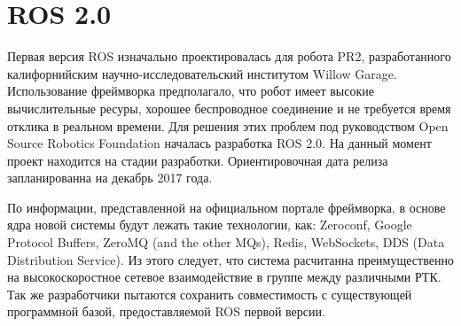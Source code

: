 \section{ROS 2.0}

Первая версия ROS изначально проектировалась для робота PR2, разработанного калифорнийским научно-исследовательский институтом Willow Garage. Использование фреймворка предполагало, что робот имеет высокие вычислительные ресуры, хорошее беспроводное соединение и не требуется время отклика в реальном времени. Для решения этих проблем под руководством Open Source Robotics Foundation началась разработка ROS 2.0. На данный момент проект находится на стадии разработки. Ориентировочная дата релиза запланированна на декабрь 2017 года.

По информации, представленной на официальном портале фреймворка, в основе ядра новой системы будут лежать такие технологии, как: Zeroconf, Google Protocol Buffers, ZeroMQ (and the other MQs), Redis, WebSockets, DDS (Data Distribution Service). Из этого следует, что система расчитанна преимущественно на высокоскоростное сетевое взаимодействие в группе между различными РТК. Так же разработчики пытаются сохранить совместимость с существующей программной базой, предоставляемой ROS первой версии.